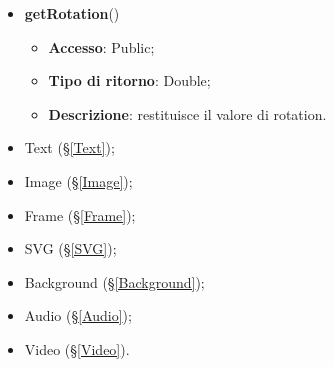 {\begin{itemize}
			\begin{itemize}
				\item \textbf{Accesso}: Public;
				\item \textbf{Tipo di ritorno}: Array;
				\item \textbf{Descrizione}: restituisce un array contenente i valori di xIndex e yIndex.
			\end{itemize}
			\item \textbf{getRotation}()
			\begin{itemize}
				\item \textbf{Accesso}: Public;
				\item \textbf{Tipo di ritorno}: Double;
				\item \textbf{Descrizione}: restituisce il valore di rotation.
			\end{itemize}
		\end{itemize}
		
		\begin{itemize}
			\item Text (\S\ref{Text});
			\item Image (\S\ref{Image});
			\item Frame (\S\ref{Frame});
			\item SVG (\S\ref{SVG});
			\item Background (\S\ref{Background});
			\item Audio (\S\ref{Audio});
			\item Video (\S\ref{Video}).
		\end{itemize}
		
}
